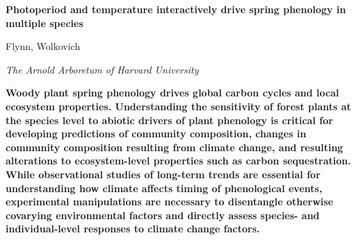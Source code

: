 \documentclass{article}
\begin{document}
\linenumbers
 

\flushleft

\textbf{\large{Photoperiod and temperature interactively drive spring phenology in multiple species}}

Flynn, Wolkovich

\textit{The Arnold Arboretum of Harvard University}


\textbf{
Woody plant spring phenology drives global carbon cycles and local ecosystem properties. Understanding the sensitivity of forest plants at the species level to abiotic drivers of plant phenology is critical for developing predictions of community composition, changes in community composition resulting from climate change, and resulting alterations to ecosystem-level properties such as carbon sequestration. While observational studies of long-term trends are essential for understanding how climate affects timing of phenological events, experimental manipulations are necessary to disentangle otherwise covarying environmental factors and directly assess species- and individual-level responses to climate change factors.
}
\end{document}
